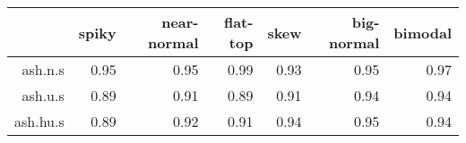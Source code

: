 \begin{tabular}{rrrrrrr}
  \toprule  & spiky & near-normal & flat-top & skew & big-normal & bimodal \\ 
  \midrule ash.n.s & 0.95 & 0.95 & 0.99 & 0.93 & 0.95 & 0.97 \\ 
  ash.u.s & 0.89 & 0.91 & 0.89 & 0.91 & 0.94 & 0.94 \\ 
  ash.hu.s & 0.89 & 0.92 & 0.91 & 0.94 & 0.95 & 0.94 \\ 
   \bottomrule \end{tabular}

